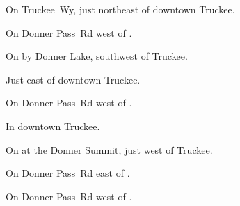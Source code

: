 
\begin{LocationList}

On Truckee~Wy, just northeast of downtown Truckee.

On Donner Pass~Rd west of .

On  by Donner Lake, southwest of Truckee.

Just east of downtown Truckee.

On Donner Pass~Rd west of .

In downtown Truckee.

\Location{\RestArea \Rest}
On  at the Donner Summit, just west of Truckee.

On Donner Pass~Rd east of .

\Location{\TruckService \Service}
On Donner Pass~Rd west of .

\end{LocationList}

